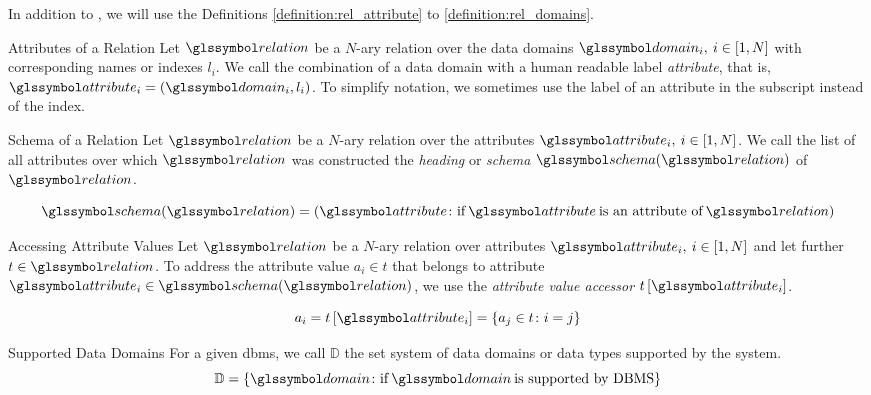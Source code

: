 In addition to , we will use the Definitions \ref{definition:rel_attribute} to \ref{definition:rel_domains}.

\begin{definition}[label=definition:rel_attribute]{Attributes of a Relation}{}
    Let $\relation$ be a $N$-ary relation over the data domains $\domain_i, \: i \in \left[1, N \right]$ with corresponding names or indexes $l_i$. We call the combination of a data domain with a human readable label \emph{attribute}, that is, $\attribute_{i} = (\domain_i, l_i)$. To simplify notation, we sometimes use the label of an attribute in the subscript instead of the index.
\end{definition}

\begin{definition}[label=definition:rel_schema]{Schema of a Relation}{}
    Let $\relation$ be a $N$-ary relation over the attributes $\attribute_i, \: i \in \left[1, N \right]$. We call the list of all attributes over which $\relation$ was constructed the \emph{heading} or \emph{schema} $\schema (\relation)$ of $\relation$.

    \begin{equation*}
        \schema (\relation) = \left( \attribute \colon \textrm{if} \: \attribute \: \textrm{is an attribute of} \: \relation \right)
    \end{equation*}   
\end{definition}

\begin{definition}[label=definition:rel_attribute_value]{Accessing Attribute Values}{}
    Let $\relation$ be a $N$-ary relation over attributes $\attribute_i, \: i \in \left[1, N \right]$ and let further $t \in \relation$. To address the attribute value $a_i \in t$ that belongs to attribute $\attribute_i \in \schema(\relation) $, we use the \emph{attribute value accessor} $t\left[ \attribute_i \right]$.

    \begin{equation*}
        a_i = t\left[ \attribute_i \right] = \{ a_j \in t \colon i = j \}
    \end{equation*}  
\end{definition}

\begin{definition}[label=definition:rel_domains]{Supported Data Domains}{}
    For a given \acrshort{dbms}, we call $\mathbb{D}$ the set system of data domains or data types supported by the system.
    \begin{equation*}
        \mathbb{D} = \{ \domain \colon \textrm{if} \: \domain \: \textrm{is supported by DBMS} \}
    \end{equation*}
\end{definition}

